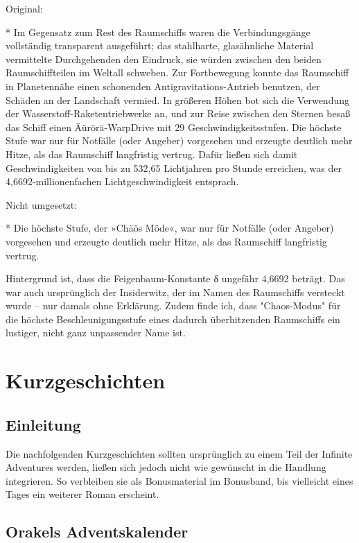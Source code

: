 Original:

* Im Gegensatz zum Rest des Raumschiffs waren die Verbindungsgänge vollständig transparent ausgeführt; das stahlharte, glasähnliche Material vermittelte Durchgehenden den Eindruck, sie würden zwischen den beiden Raumschiffteilen im Weltall schweben. Zur Fortbewegung konnte das Raumschiff in Planetennähe einen schonenden Antigravitations-Antrieb benutzen, der Schäden an der Landschaft vermied. In größeren Höhen bot sich die Verwendung der Wasserstoff-Raketentriebwerke an, und zur Reise zwischen den Sternen besaß das Schiff einen Äürörä-WarpDrive mit 29 Geschwindigkeitsstufen. Die höchste Stufe war nur für Notfälle (oder Angeber) vorgesehen und erzeugte deutlich mehr Hitze, als das Raumschiff langfristig vertrug. Dafür ließen sich damit Geschwindigkeiten von bis zu 532,65 Lichtjahren pro Stunde erreichen, was der 4,6692-millionenfachen Lichtgeschwindigkeit entsprach.

Nicht umgesetzt:

* Die höchste Stufe, der »Chäös Möde«, war nur für Notfälle (oder Angeber) vorgesehen und erzeugte deutlich mehr Hitze, als das Raumschiff langfristig vertrug.

Hintergrund ist, dass die Feigenbaum-Konstante δ ungefähr 4,6692 beträgt. Das war auch ursprünglich der Insiderwitz, der im Namen des Raumschiffs versteckt wurde – nur damals ohne Erklärung. Zudem finde ich, dass "Chaos-Modus" für die höchste Beschleunigungsstufe eines dadurch überhitzenden Raumschiffs ein lustiger, nicht ganz unpassender Name ist.


\chapter{Kurzgeschichten}

\section{Einleitung}

Die nachfolgenden Kurzgeschichten sollten ursprünglich zu einem Teil der Infinite Adventures werden, ließen sich jedoch nicht wie gewünscht in die Handlung integrieren. So verbleiben sie als Bonusmaterial im Bonusband, bis vielleicht eines Tages ein weiterer Roman erscheint.


\section{Orakels Adventskalender}

